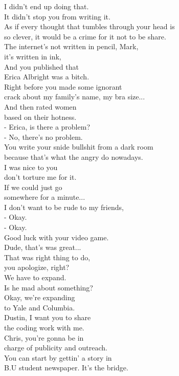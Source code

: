 \documentclass{article}
\begin{document}
\begin{multicols}{3}
I didn't end up doing that.\\
It didn't stop you from writing it.\\
As if every thought that tumbles through your head is\\
so clever, it would be a crime for it not to be share.\\
The internet's not written in pencil, Mark,\\
it's written in ink,\\
And you published that\\
Erica Albright was a bitch.\\
Right before you made some ignorant\\
crack about my family's name, my bra size...\\
And then rated women\\
based on their hotness.\\
- Erica, is there a problem?\\
- No, there's no problem.\\
You write your snide bullshit from a dark room\\
because that's what the angry do nowadays.\\
I was nice to you\\
don't torture me for it.\\
If we could just go\\
somewhere for a minute...\\
I don't want to be rude to my friends,\\
- Okay.\\
- Okay.\\
Good luck with your video game.\\
Dude, that's was great...\\
That was right thing to do,\\
you apologize, right?\\
We have to expand.\\
Is he mad about something?\\
Okay, we're expanding\\
to Yale and Columbia.\\
Dustin, I want you to share\\
the coding work with me.\\
Chris, you're gonna be in\\
charge of publicity and outreach.\\
You can start by gettin' a story in\\
B.U student newspaper. It's the bridge.\\

\end{multicols}
\end{document}
